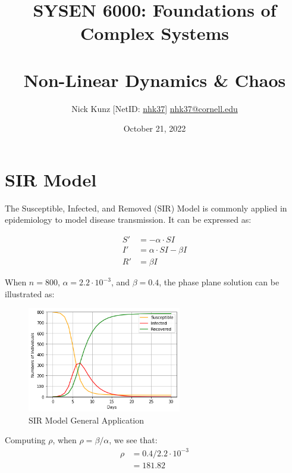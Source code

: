 \documentclass{article}
\begin{document}
\title{SYSEN 6000: Foundations of Complex Systems\\~\\
    \Large Non-Linear Dynamics \& Chaos
}
\author{
    Nick Kunz [NetID: \url{nhk37}] \hyperlink{nhk37@cornell.edu}{nhk37@cornell.edu}}
\date{October 21, 2022}
\maketitle
\thispagestyle{fancy}

\section*{SIR Model}
The Susceptible, Infected, and Removed (SIR) Model is commonly applied in epidemiology to model disease transmission. It can be expressed as:

    \begin{equation}
    \begin{split}
        S' & = -\alpha \cdot SI \\
        I' & = \alpha \cdot SI - \beta I \\
        R' & = \beta I
    \end{split}
    \end{equation}

When $n=800$, $\alpha = 2.2 \cdot 10^{-3}$, and $\beta = 0.4$, the phase plane solution can be illustrated as:

    \begin{figure}[h]
        \centering
        \includegraphics[width=0.6\textwidth]{800.png}
        \caption{SIR Model General Application}
        \label{fig:sir_800}
    \end{figure}
    
Computing $\rho$, when $\rho = \beta / \alpha$, we see that:
    \begin{equation}
    \begin{split}
        \rho 
            & = 0.4 / 2.2 \cdot 10^{-3} \\
            & = 181.82
    \end{split}
    \end{equation}
\end{document}
